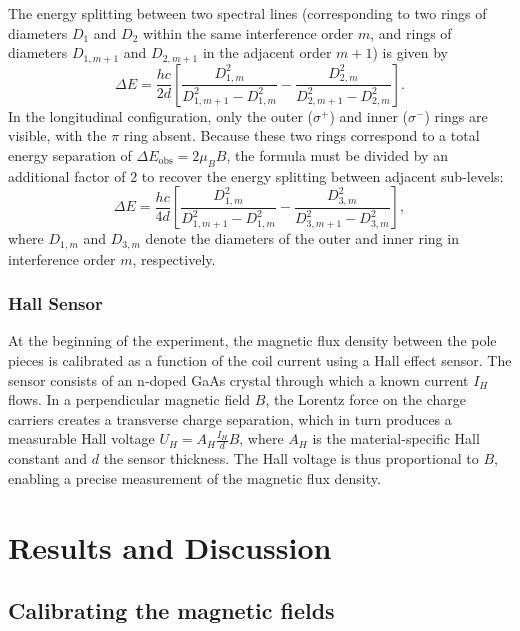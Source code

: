\documentclass{article}
\begin{document}
The energy splitting between two spectral lines (corresponding to two rings of diameters $D_1$ and $D_2$ within the same interference order $m$, and rings of diameters $D_{1,m+1}$ and $D_{2,m+1}$ in the adjacent order $m+1$) is given by
\begin{equation}
    \Delta E = \frac{hc}{2d}\left[\frac{D_{1,m}^2}{D_{1,m+1}^2 - D_{1,m}^2} - \frac{D_{2,m}^2}{D_{2,m+1}^2 - D_{2,m}^2}\right].
    \label{eq:delta_E_transversal}
\end{equation}
In the longitudinal configuration, only the outer ($\sigma^+$) and inner ($\sigma^-$) rings are visible, with the $\pi$ ring absent. Because these two rings correspond to a total energy separation of $\Delta E_\mathrm{obs} = 2\mu_B B$, the formula must be divided by an additional factor of 2 to recover the energy splitting between adjacent sub-levels:
\begin{equation}
    \Delta E = \frac{hc}{4d}\left[\frac{D_{1,m}^2}{D_{1,m+1}^2 - D_{1,m}^2} - \frac{D_{3,m}^2}{D_{3,m+1}^2 - D_{3,m}^2}\right],
    \label{eq:delta_E_longitudinal}
\end{equation}
where $D_{1,m}$ and $D_{3,m}$ denote the diameters of the outer and inner ring in interference order $m$, respectively.

\subsubsection{Hall Sensor}

At the beginning of the experiment, the magnetic flux density between the pole pieces is calibrated as a function of the coil current using a Hall effect sensor. The sensor consists of an n-doped GaAs crystal through which a known current $I_H$ flows. In a perpendicular magnetic field $B$, the Lorentz force on the charge carriers creates a transverse charge separation, which in turn produces a measurable Hall voltage $U_H = A_H \frac{I_H}{d} B$, where $A_H$ is the material-specific Hall constant and $d$ the sensor thickness. The Hall voltage is thus proportional to $B$, enabling a precise measurement of the magnetic flux density.

\section{Results and Discussion}

\subsection{Calibrating the magnetic fields}
\end{document}

